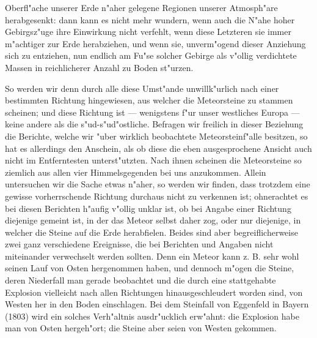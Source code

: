 \documentclass[a4paper, 8pt, oneside, polutonikogreek, german]{article}
\begin{document}
Oberfl"ache unserer Erde n"aher gelegene Regionen unserer Atmosph"are herabgesenkt: dann kann es nicht mehr wundern, wenn auch die N"ahe hoher Gebirgsz"uge ihre Einwirkung nicht verfehlt, wenn diese Letzteren sie immer m"achtiger zur Erde herabziehen, und wenn sie, unverm"ogend dieser Anziehung sich zu entziehen, nun endlich am Fu"se solcher Gebirge als v"ollig verdichtete Massen in reichlicherer Anzahl zu Boden st"urzen.

So werden wir denn durch alle diese Umst"ande unwillk"urlich nach einer bestimmten Richtung hingewiesen, aus welcher die Meteorsteine zu stammen scheinen; und diese Richtung ist --- wenigstens f"ur unser westliches Europa --- keine andere als die s"ud-s"ud"ostliche. Befragen wir freilich in dieser Beziehung die Berichte, welche wir "uber wirklich beobachtete Meteorsteinf"alle besitzen, so hat es allerdings den Anschein, als ob diese die eben ausgesprochene Ansicht auch nicht im Entferntesten unterst"utzten. Nach ihnen scheinen die Meteorsteine so ziemlich aus allen vier Himmelsgegenden bei uns anzukommen. Allein untersuchen wir die Sache etwas n"aher, so werden wir finden, dass trotzdem eine gewisse vorherrschende Richtung durchaus nicht zu verkennen ist; ohnerachtet es bei diesen Berichten h"aufig v"ollig unklar ist, ob bei Angabe einer Richtung diejenige gemeint ist, in der das Meteor selbst daher zog, oder nur diejenige, in welcher die Steine auf die Erde herabfielen. Beides sind aber begreiflicherweise zwei ganz verschiedene Ereignisse, die bei Berichten und Angaben nicht miteinander verwechselt werden sollten. Denn ein Meteor kann z. B. sehr wohl seinen Lauf von Osten hergenommen haben, und dennoch m"ogen die Steine, deren Niederfall man gerade beobachtet und die durch eine stattgehabte Explosion vielleicht nach allen Richtungen hinausgeschleudert worden sind, von Westen her in den Boden einschlagen. Bei dem Steinfall von Eggenfeld in Bayern (1803) wird ein solches Verh"altnis ausdr"ucklich erw"ahnt: die Explosion habe man von Osten hergeh"ort; die Steine aber seien von Westen gekommen.
\end{document}
